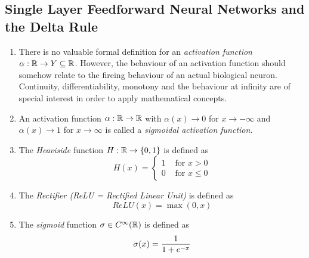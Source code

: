\subsection{Single Layer Feedforward Neural Networks and the Delta Rule}
\bigskip

\begin{definition}
    \hfill
    \begin{enumerate}
        \item There is no valuable formal definition for an \emph{activation function}
              \( \alpha: \mathbb{R} \to Y \subseteq \mathbb{R} \). However, the behaviour of an activation function should
              somehow relate to the fireing behaviour of an actual biological neuron. Continuity,
              differentiability, monotony and the behaviour at infinity are of special interest in order
              to apply mathematical concepts.
        \item An activation function \( \alpha: \mathbb{R} \to \mathbb{R} \) with \( \alpha(x) \to 0 \)
              for \( x \to -\infty \) and \( \alpha(x) \to 1 \) for \( x \to \infty \) is called a
              \emph{sigmoidal activation function}.
        \item The \emph{Heaviside} function \( H: \mathbb{R} \to \{ 0, 1 \} \) is defined as
              \[
                  H(x) = \left \{
                  \begin{array}{ll}
                      1 & \text{ for } x > 0  \\
                      0 & \text{ for }x \le 0
                  \end{array}
                  \right.
              \]
        \item The \emph{Rectifier (ReLU = Rectified Linear Unit)} is defined as
              \[
                  ReLU(x) = \max(0, x)
              \]
        \item The \emph{sigmoid} function \( \sigma \in C^\infty(\mathbb{R}) \) is defined as
              \[
                  \sigma(x) = \frac{1}{1 + e^{-x}}
              \]
    \end{enumerate}
\end{definition}
\bigskip


